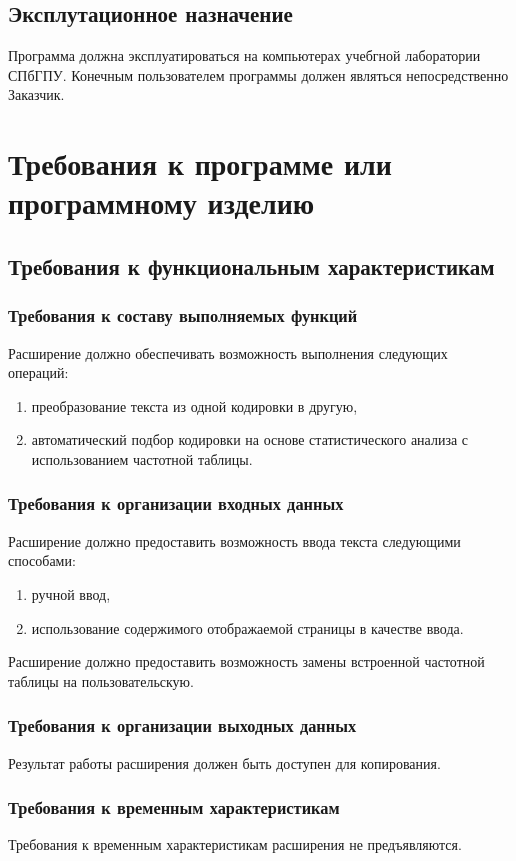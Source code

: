 \documentclass[a4paper,10pt]{article}
\begin{document}
\subsection{Эксплутационное назначение}
Программа должна эксплуатироваться на компьютерах учебгной лаборатории СПбГПУ.
Конечным пользователем программы должен являться непосредственно Заказчик.

\section{Требования к программе или программному изделию}
\subsection{Требования к функциональным характеристикам}
\subsubsection{Требования к составу выполняемых функций}
Расширение должно обеспечивать возможность выполнения следующих операций:
\begin{enumerate}
  \item преобразование текста из одной кодировки в другую,
  \item автоматический подбор кодировки на основе статистического анализа с использованием частотной таблицы.
\end{enumerate}
\subsubsection{Требования к организации входных данных}
Расширение должно предоставить возможность ввода текста следующими способами:
\begin{enumerate}
  \item ручной ввод,
  \item использование содержимого отображаемой страницы в качестве ввода.
\end{enumerate}

Расширение должно предоставить возможность замены встроенной частотной таблицы на пользовательскую.

\subsubsection{Требования к организации выходных данных}
Результат работы расширения должен быть доступен для копирования.

\subsubsection{Требования к временным характеристикам}
Требования к временным характеристикам расширения не предъявляются.
\end{document}
